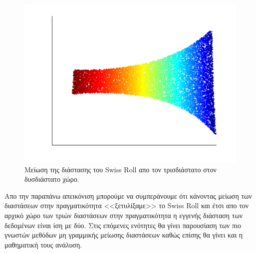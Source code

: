 \clearpage
\begin{figure}[t]
\centering
\includegraphics[scale=0.8]{figs/4.png}
\newline
\caption{Μείωση της διάστασης του \textlatin{Swiss Roll} απο τον τρισδιάστατο στον δυσδιάστατο χώρο.} 
\end{figure}
\par
\vspace*{1cm}
Απο την παραπάνω απεικόνιση μπορούμε να συμπεράνουμε ότι κάνοντας μείωση των διαστάσεων στην πραγματικότητα <<ξετυλίξαμε>> το \textlatin{Swiss Roll}\textlatin{\cite{swiss_roll}} και έτσι απο τον αρχικό χώρο των τριών διαστάσεων στην πραγματικότητα η εγγενής διάσταση των δεδομένων είναι ίση με δύο. Στις επόμενες ενότητες θα γίνει παρουσίαση των πιο γνωστών μεθόδων μη γραμμικής μείωσης διαστάσεων καθώς επίσης θα γίνει και η μαθηματική τους ανάλυση.



